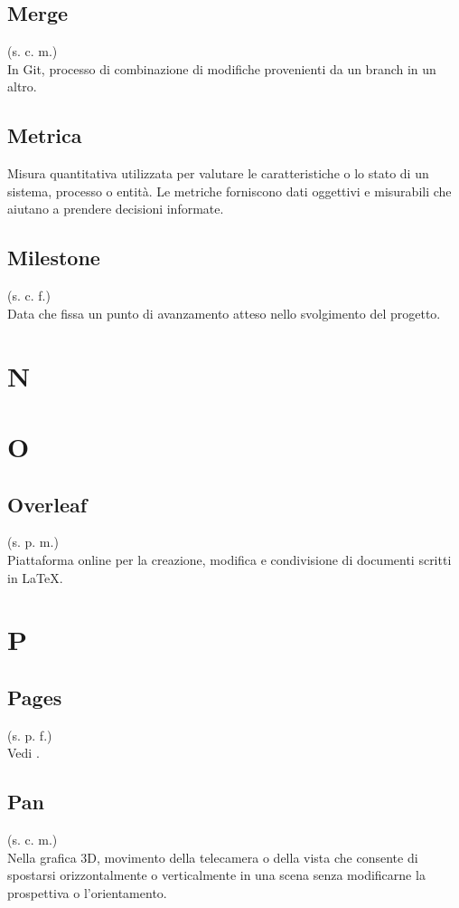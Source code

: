     \subsection{Merge}
    (s. c. m.)\\
    In Git, processo di combinazione di modifiche provenienti da un branch in un altro.
    \subsection{Metrica}
    Misura quantitativa utilizzata per valutare le caratteristiche o lo stato di un sistema, processo o entità. 
    Le metriche forniscono dati oggettivi e misurabili che aiutano a prendere decisioni informate.
    \subsection{Milestone}
    (s. c. f.)\\
    Data che fissa un punto di avanzamento atteso nello svolgimento del progetto.
    \pagebreak
\section{N}
\pagebreak
\section{O}
    \subsection{Overleaf}
    (s. p. m.)\\
    Piattaforma online per la creazione, modifica e condivisione di documenti 
    scritti in LaTeX.
\pagebreak
\section{P}
    \subsection{Pages}
    (s. p. f.)\\
    Vedi .
    \subsection{Pan}
    (s. c. m.)\\
    Nella grafica 3D, movimento della telecamera o della vista che consente 
    di spostarsi orizzontalmente o verticalmente in una scena senza modificarne 
    la prospettiva o l'orientamento.
